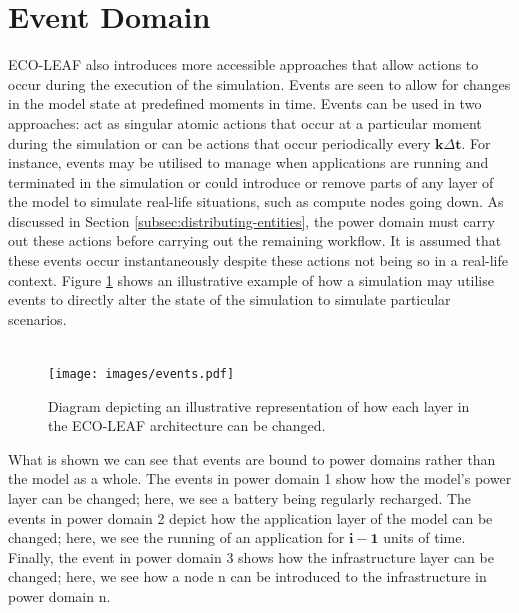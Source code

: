 \documentclass{l4proj}
\begin{document}
\section{Event Domain}\label{sec:events}
ECO-LEAF also introduces more accessible approaches that allow actions to occur during the execution of the simulation.
Events are seen to allow for changes in the model state at predefined moments in time.
Events can be used in two approaches: act as singular atomic actions that occur at a particular moment during the simulation or can be actions that occur periodically every $\mathbf{k\varDelta t}$.
For instance, events may be utilised to manage when applications are running and terminated in the simulation or could introduce or remove parts of any layer of the model to simulate real-life situations, such as compute nodes going down.
As discussed in Section \ref{subsec:distributing-entities}, the power domain must carry out these actions before carrying out the remaining workflow.
It is assumed that these events occur instantaneously despite these actions not being so in a real-life context.
Figure \ref{fig:events} shows an illustrative example of how a simulation may utilise events to directly alter the state of the simulation to simulate particular scenarios.\\ \\
\begin{figure}[h]
    \centering
    \texttt{[image: images/events.pdf]}
    ~
    \caption{Diagram depicting an illustrative representation of how each layer in the ECO-LEAF architecture can be changed.}
    \label{fig:events}
\end{figure}
What is shown we can see that events are bound to power domains rather than the model as a whole.
The events in power domain 1 show how the model's power layer can be changed; here, we see a battery being regularly recharged.
The events in power domain 2 depict how the application layer of the model can be changed; here, we see the running of an application for $\mathbf{i - 1}$ units of time.
Finally, the event in power domain 3 shows how the infrastructure layer can be changed; here, we see how a node n can be introduced to the infrastructure in power domain n.
\end{document}

